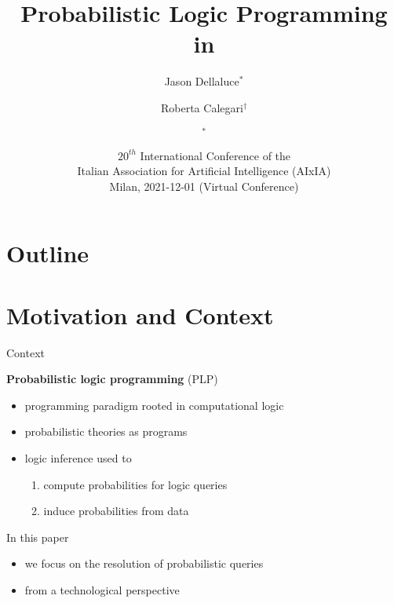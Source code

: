 \documentclass[presentation]{beamer}\mode<presentation>{\usetheme{AMSBolognaFC}}
\title[PLP in \twopkt{}]{Probabilistic Logic Programming in \twopkt{}}
\author[Dellaluce \and Calegari \and \sspeaker{Ciatto}]{
    Jason Dellaluce$^*$ \and Roberta Calegari$^\dagger$ \and \speaker{Giovanni Ciatto}$^*$
    \\\smallskip\small
    \email{jason.dellaluce@studio.unibo.it} \and \email{roberta.calegari@unibo.it} \and \speaker{\email{giovanni.ciatto@unibo.it}}
}
\institute[UniBO]{
    $^*$ \disi
    \\
    $^\dagger$ \almaai
    \\
    $^{*\dagger}$ \unibo
}
\date[AIxIA, Dec. 1, 2021]{
    $20^{th}$ International Conference of the
    \\
    Italian Association for Artificial Intelligence (AIxIA)
    \\\medskip
    Milan, 2021-12-01 (Virtual Conference)
}
\begin{document}

\frame{\titlepage}

\section*{Outline}

\frame[c]{\tableofcontents[hideallsubsections]}

\section{Motivation and Context}

\begin{frame}[c]{Context}
    \begin{block}{\textbf{Probabilistic logic programming} (PLP)}
        \begin{itemize}
            \item programming paradigm rooted in computational logic
            \item \alert{probabilistic} theories as programs
            \item logic \alert{inference} used to
            \begin{enumerate}
                \item compute \alert{probabilities} for logic queries
                \item induce probabilities from data
            \end{enumerate}
        \end{itemize}
    \end{block}
    \begin{block}{In this paper}
        \begin{itemize}
            \item we focus on the \alert{resolution} of probabilistic queries
            \item from a \alert{technological} perspective
        \end{itemize}
    \end{block}
\end{frame}
\end{document}
